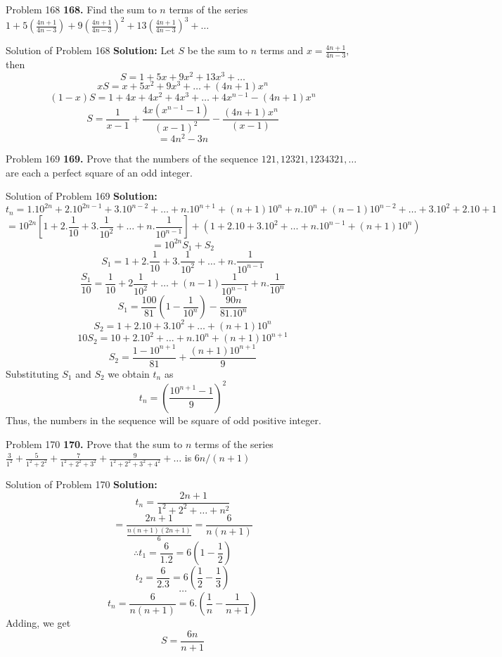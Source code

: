 \documentclass[aspectratio=1610,8pt]{beamer}
\begin{document}
\begin{frame}{Problem 168}
  \textbf{168.} Find the sum to $n$ terms of the series $1 + 5\left(\frac{4n + 1}{4n - 3}\right) + 9\left(\frac{4n + 1}{4n -
    3}\right)^2 + 13\left(\frac{4n + 1}{4n - 3}\right)^3 + \ldots$
\end{frame}
\begin{frame}{Solution of Problem 168}
  \textbf{Solution:} Let $S$ be the sum to $n$ terms and $x = \frac{4n + 1}{4n - 3},$ then
  $$S = 1 + 5x + 9x^2 + 13x^3 + \ldots$$
  $$xS = x + 5x^2 + 9x^3 + \ldots + (4n + 1)x^n$$
  $$(1 - x)S = 1 + 4x + 4x^2 + 4x^3 + \ldots + 4x^{n - 1} - (4n + 1)x^n$$
  $$S = \frac{1}{x - 1} + \frac{4x(x^{n - 1} - 1)}{(x - 1)^2} - \frac{(4n + 1)x^n}{(x - 1)}$$
  $$= 4n^2 - 3n$$
\end{frame}
\begin{frame}{Problem 169}
  \textbf{169.} Prove that the numbers of the sequence $121, 12321, 1234321, \ldots$ are each a perfect square of an odd integer.
\end{frame}
\begin{frame}{Solution of Problem 169}
  \textbf{Solution:} $$t_n = 1.10^{2n} + 2.10^{2n - 1} + 3.10^{n - 2} + \ldots + n.10^{n + 1} + (n + 1)10^n + n.10^n + (n - 1)10^{n
    - 2} + \ldots + 3.10^2 + 2.10 + 1$$
  $$= 10^{2n}\left[1 + 2.\frac{1}{10} + 3.\frac{1}{10^2} + \ldots + n.\frac{1}{10^{n - 1}}\right] + (1 + 2.10 + 3.10^2 + \ldots +
  n.10^{n - 1} + (n + 1)10^n)$$
  $$= 10^{2n}S_1 + S_2$$
  $$S_1 = 1 + 2.\frac{1}{10} + 3.\frac{1}{10^2} + \ldots + n.\frac{1}{10^{n - 1}}$$
  $$\frac{S_1}{10} = \frac{1}{10} + 2\frac{1}{10^2} + \ldots + (n - 1)\frac{1}{10^{n - 1}} + n.\frac{1}{10^n}$$
  $$S_1 = \frac{100}{81}\left(1 - \frac{1}{10^n}\right) - \frac{90n}{81.10^n}$$
  $$S_2 = 1 + 2.10 + 3.10^2 + \ldots + (n + 1)10^n$$
  $$10S_2 = 10 + 2.10^2 + \ldots + n.10^n + (n + 1)10^{n + 1}$$
  $$S_2 = \frac{1 - 10^{n + 1}}{81} + \frac{(n + 1)10^{n + 1}}{9}$$
  Substituting $S_1$ and $S_2$ we obtain $t_n$ as
  $$t_n = \left(\frac{10^{n + 1} - 1}{9}\right)^2$$
  Thus, the numbers in the sequence will be square of odd positive integer.
\end{frame}
\begin{frame}{Problem 170}
  \textbf{170.} Prove that the sum to $n$ terms of the series $\frac{3}{1^2} + \frac{5}{1^2 + 2^2} + \frac{7}{1^2 + 2^2 + 3^2} +
  \frac{9}{1^2 + 2^2 + 3^2 + 4^2} + \ldots$ is $6n/(n + 1)$
\end{frame}
\begin{frame}{Solution of Problem 170}
  \textbf{Solution:} $$t_n = \frac{2n + 1}{1^2 + 2^2 + \ldots + n^2}$$
  $$= \frac{2n + 1}{\frac{n(n + 1)(2n + 1)}{6}} = \frac{6}{n(n + 1)}$$
  $$\therefore t_1 = \frac{6}{1.2} = 6\left(1 - \frac{1}{2}\right)$$
  $$t_2 = \frac{6}{2.3} = 6\left(\frac{1}{2} - \frac{1}{3}\right)$$
  $$\ldots$$
  $$t_n = \frac{6}{n(n + 1)} = 6.\left(\frac{1}{n} - \frac{1}{n + 1}\right)$$
  Adding, we get
  $$S = \frac{6n}{n + 1}$$
\end{frame}
\end{document}
